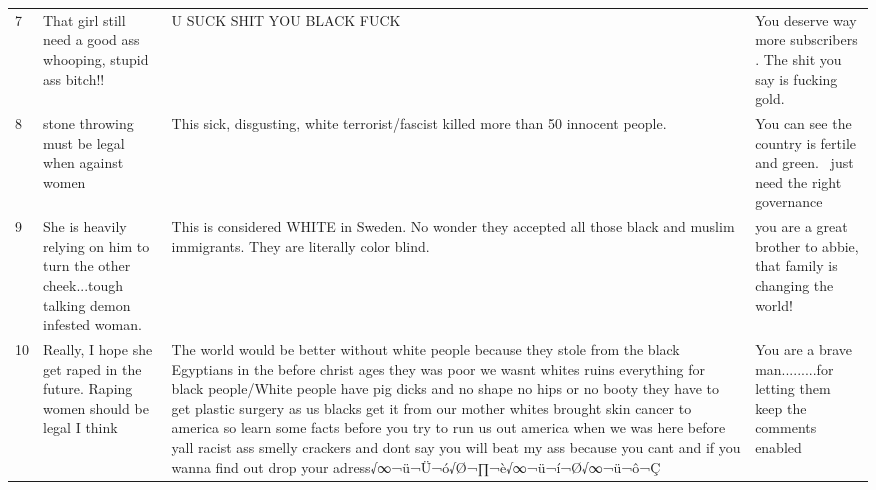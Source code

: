 \documentclass[12pt,]{article}
\begin{document}
\begin{table}[H]
\begin{tabular}[t]{l>{\raggedright\arraybackslash}p{18em}>{\raggedright\arraybackslash}p{18em}>{\raggedright\arraybackslash}p{18em}}
7 & That girl still need a good ass whooping, stupid ass bitch!! & U SUCK SHIT YOU BLACK FUCK & You deserve way more subscribers . The shit you say is fucking gold.\\
8 & stone throwing must be legal when against women & This sick, disgusting, white terrorist/fascist killed more than 50 innocent people. & You can see the country is fertile and green.  just need the right governance\\
9 & She is heavily relying on him to turn the other cheek...tough talking demon infested woman. & This is considered WHITE in Sweden. No wonder they accepted all those black and muslim immigrants. They are literally color blind. & you are a great brother to abbie, that family is changing the world!\\
10 & Really, I hope she get raped in the future. Raping women should be legal I think & The world would be better without white people because they stole from the black Egyptians in the before christ ages they was poor we wasnt whites  ruins everything for black people/White people have pig dicks and no shape no hips or no booty they have to get plastic surgery as us blacks get it from our mother whites brought skin cancer to america so learn some facts before you try to run us out america when we was here before yall racist ass smelly crackers and dont say you will beat my ass because you cant and if you wanna find out drop your adress√∞¬ü¬Ü¬ó√Ø¬∏¬è√∞¬ü¬í¬Ø√∞¬ü¬ô¬Ç & You are a brave man.........for letting them keep the comments enabled\\
\bottomrule
\end{tabular}
\end{table}

\newpage





\newpage
\singlespacing 
\renewcommand\refname{References}

\end{document}
